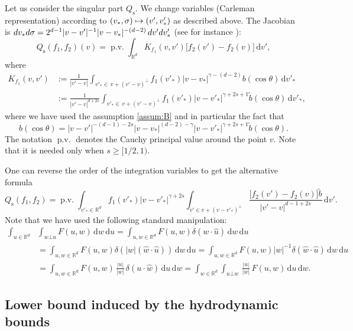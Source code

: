 \documentclass[11pt]{article}
\newcommand\mto{\mathchoice{\longmapsto}{\mapsto}{\mapsto}{\mapsto}}
\newcommand{\rs}{\mathrm{s}}
\theoremstyle{plain}
\theoremstyle{definition}
\numberwithin{equation}{section}
\newcommand{\R}{\mathbb R}
\newcommand{\dd} {\, \mathrm{d}}
\DeclareMathOperator{\PV}{p.v.}
\begin{document}
Let us consider the singular part $Q_{\rs}$. We change variables (Carleman
representation) according to $(v_*,\sigma) \mto (v',v'_*)$ as
described above. The Jacobian is
${\rm d} v_* {\rm d}\sigma = 2^{d-1} |v-v'|^{-1} |v-v_*|^{-(d-2)} \, {\rm d} v'
{\rm d} v'_*$ (see for instance \cite[Lem.\,A.1]{luis}):
\begin{equation}\label{eq:Carl-rep}
Q_{\rs}(f_1,f_2)(v) = \PV \int_{\R^d} K_{f_1}(v,v') \big[ f_2(v')-f_2(v) \big] \dd v',
\end{equation}
where
\begin{align} \nonumber
K_{f_1}(v,v') & := \frac{1}{|v'-v|} \int_{v'_* \in \, v +
(v'-v)^\bot} f_1(v'_*) |v-v_*|^{\gamma-(d-2)} b(\cos \theta) \dd
v'_* \\ \label{e:kernel-K}
& := \frac{1}{|v'-v|^{d+2s}} \int_{v'_* \in \, v +
(v'-v)^\bot} f_1(v'_*) |v-v'_*|^{\gamma+2s+1} \tilde b(\cos \theta) \dd
v'_*,
\end{align}
where we have used the assumption \eqref{assum:B} and in particular
the fact that
\[
b(\cos \theta) = |v-v'|^{-(d-1)-2s}
|v-v_*|^{(d-2)-\gamma} |v-v'_*|^{\gamma+2s+1} \tilde b(\cos
\theta).
\]
The notation $\PV$ denotes the Cauchy principal value around
the point $v$. Note that it is needed only when $s \ge [1/2,1)$.

One can reverse the order of the integration variables to get the
alternative formula%
\begin{equation}\label{eq:Carl-rep-reverse}
Q_{\rs}(f_1,f_2) = \PV \int_{v'_* \in \R^d} f_1(v'_*) |v-v'_*|^{\gamma+2s}
\int_{v'\in v +
(v-v'_*)^\bot} \frac{\big[ f_2(v')-f_2(v) \big] \tilde b}{|v'-v|^{d-1+2s}} \dd v'.
\end{equation}
Note that we have used the following standard manipulation:
\begin{align*}
\int_{u \in \R^d} &\int_{w \bot u} F(u,w) \dd w \dd u = \int_{u,w\in \R^d}
F(u,w) \delta(w \cdot \hat u) \dd w \dd u \\
& = \int_{u,w\in \R^d} F(u,w) \delta(|w| (\hat w \cdot \hat u))
\dd w \dd u
= \int_{u,w\in \R^d} F(u,w) |w|^{-1} \delta(\hat w \cdot \hat
u) \dd w \dd u\\
& = \int_{u,w\in \R^d} F(u,w) \,\frac{|u|}{|w|}\, \delta(u \cdot \hat
w) \dd u \dd w = \int_{w \in \R^d} \int_{u \bot w}
\,\frac{|u|}{|w|}\, F(u,w) \dd u \dd w.
\end{align*}

\subsection{Lower bound induced by the hydrodynamic bounds}
\end{document}
